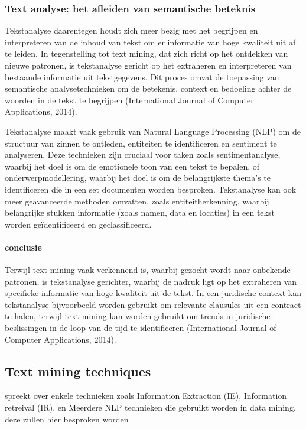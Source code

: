 \subsubsection{Text analyse: het afleiden van semantische beteknis}
Tekstanalyse daarentegen houdt zich meer bezig met het begrijpen en interpreteren van de inhoud van tekst om er informatie van hoge kwaliteit uit af te leiden. In tegenstelling tot text mining, dat zich richt op het ontdekken van nieuwe patronen, is tekstanalyse gericht op het extraheren en interpreteren van bestaande informatie uit tekstgegevens. Dit proces omvat de toepassing van semantische analysetechnieken om de betekenis, context en bedoeling achter de woorden in de tekst te begrijpen (International Journal of Computer Applications, 2014).

Tekstanalyse maakt vaak gebruik van Natural Language Processing (NLP) om de structuur van zinnen te ontleden, entiteiten te identificeren en sentiment te analyseren. Deze technieken zijn cruciaal voor taken zoals sentimentanalyse, waarbij het doel is om de emotionele toon van een tekst te bepalen, of onderwerpmodellering, waarbij het doel is om de belangrijkste thema's te identificeren die in een set documenten worden besproken. Tekstanalyse kan ook meer geavanceerde methoden omvatten, zoals entiteitherkenning, waarbij belangrijke stukken informatie (zoals namen, data en locaties) in een tekst worden geïdentificeerd en geclassificeerd.

\paragraph{conclusie}
Terwijl text mining vaak verkennend is, waarbij gezocht wordt naar onbekende patronen, is tekstanalyse gerichter, waarbij de nadruk ligt op het extraheren van specifieke informatie van hoge kwaliteit uit de tekst. In een juridische context kan tekstanalyse bijvoorbeeld worden gebruikt om relevante clausules uit een contract te halen, terwijl text mining kan worden gebruikt om trends in juridische beslissingen in de loop van de tijd te identificeren (International Journal of Computer Applications, 2014).




\subsection{Text mining techniques}
\autocite{Talib2016TextMining} spreekt over enkele technieken zoals Information Extraction (IE), Information retreival (IR), en Meerdere NLP technieken die gebruikt worden in data mining, deze zullen hier besproken worden

